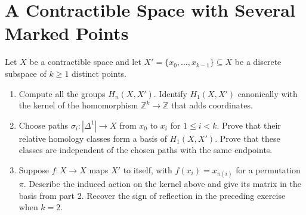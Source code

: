 \documentclass[11pt]{article}
\begin{document}
\section{A Contractible Space with Several Marked Points}
Let $X$ be a contractible space and let $X'=\{x_0,\ldots,x_{k-1}\}\subseteq X$ be a discrete subspace of $k\geq1$ distinct points.
\begin{enumerate}
\item Compute all the groups $H_n(X,X')$. Identify $H_1(X,X')$ canonically with the kernel of the homomorphism $\mathbb Z^k\to\mathbb Z$ that adds coordinates.
\item Choose paths $\sigma_i:|\Delta^1|\to X$ from $x_0$ to $x_i$ for $1\leq i<k$. Prove that their relative homology classes form a basis of $H_1(X,X')$. Prove that these classes are independent of the chosen paths with the same endpoints.
\item Suppose $f:X\to X$ maps $X'$ to itself, with $f(x_i)=x_{\pi(i)}$ for a permutation $\pi$. Describe the induced action on the kernel above and give its matrix in the basis from part 2. Recover the sign of reflection in the preceding exercise when $k=2$.
\end{enumerate}
\end{document}
